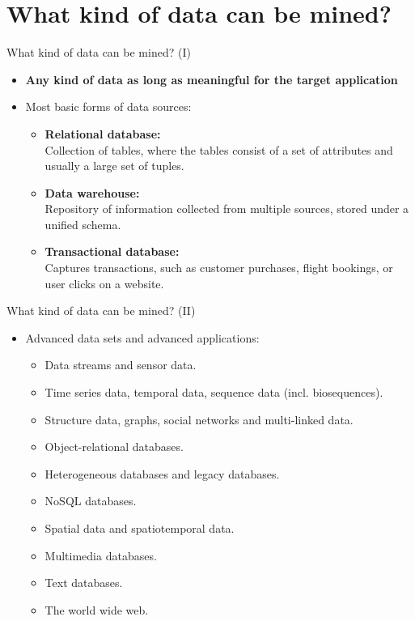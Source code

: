 \section{What kind of data can be mined?}

\begin{frame}{What kind of data can be mined? (I)}
	\begin{itemize}
		\item \textbf{Any kind of data as long as meaningful for the target 
		application}
		\item Most basic forms of data sources:
		\begin{itemize}
			\item \textbf{Relational database:} \\
				  \small{Collection of tables, where the tables consist of a 
				  set of attributes and usually a large set of tuples.}
			\item \textbf{Data warehouse:} \\
				  \small{Repository of information collected from multiple 
				  sources, stored under a unified schema.}
			\item \textbf{Transactional database:} \\
				  \small{Captures transactions, such as customer purchases, 
				  flight bookings, or user clicks on a website.}
		\end{itemize}
	\end{itemize}
\end{frame}
\begin{frame}{What kind of data can be mined? (II)}
	\begin{itemize}
		\item Advanced data sets and advanced applications:
		\begin{itemize}
			\item Data streams and sensor data.
			\item Time series data, temporal data, sequence data (incl. 
			biosequences).
			\item Structure data, graphs, social networks and multi-linked data.
			\item Object-relational databases.
			\item Heterogeneous databases and legacy databases.
			\item NoSQL databases.
			\item Spatial data and spatiotemporal data.
			\item Multimedia databases.
			\item Text databases.
			\item The world wide web.
		\end{itemize}
	\end{itemize}
\end{frame}